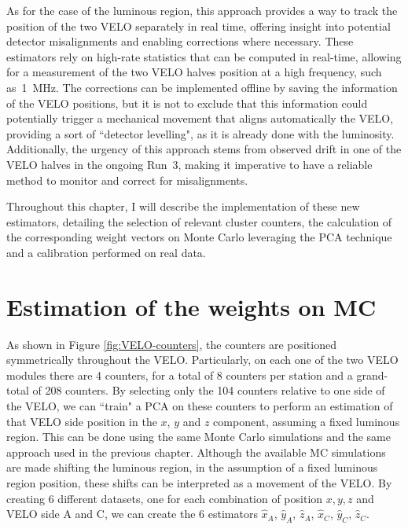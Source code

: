 As for the case of the luminous region, this approach provides a way to track the position of the two VELO separately in real time, offering insight into potential detector misalignments and enabling corrections where necessary. These estimators rely on high-rate statistics that can be computed in real-time, allowing for a measurement of the two VELO halves position at a high frequency, such as~\SI{1}{\mega\hertz}. The corrections can be implemented offline by saving the information of the VELO positions, but it is not to exclude that this information could potentially trigger a mechanical movement that aligns automatically the VELO, providing a sort of ``detector levelling", as it is already done with the luminosity. Additionally, the urgency of this approach stems from observed drift in one of the VELO halves in the ongoing Run~3, making it imperative to have a reliable method to monitor and correct for misalignments.

Throughout this chapter, I will describe the implementation of these new estimators, detailing the selection of relevant cluster counters, the calculation of the corresponding weight vectors on Monte Carlo leveraging the PCA technique and a calibration performed on real data.



\section{Estimation of the weights on MC}
As shown in Figure \ref{fig:VELO-counters}, the counters are positioned symmetrically throughout the VELO. Particularly, on each one of the two VELO modules there are 4 counters, for a total of 8 counters per station and a grand-total of 208 counters. By selecting only the 104 counters relative to one side of the VELO, we can ``train" a PCA on these counters to perform an estimation of that VELO side position in the $x$, $y$ and $z$ component, assuming a fixed luminous region. This can be done using the same Monte Carlo simulations and the same approach used in the previous chapter. Although the available MC simulations are made shifting the luminous region, in the assumption of a fixed luminous region position, these shifts can be interpreted as a movement of the VELO. By creating 6 different datasets, one for each combination of position $x,y,z$ and VELO side A and C, we can create the 6 estimators $\hat{x}_A$, $\hat{y}_A$, $\hat{z}_A$, $\hat{x}_C$, $\hat{y}_C$, $\hat{z}_C$.  

